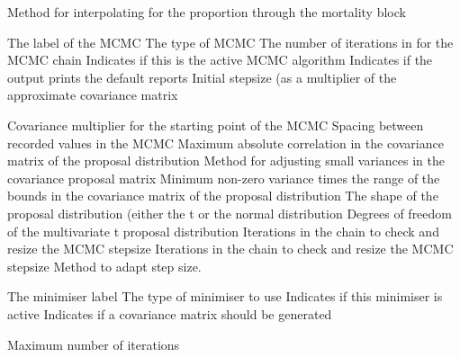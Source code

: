  {Method for interpolating for the proportion through the mortality block}
\par\textbf{}\par
\par\textbf{}\par
{}\par\par
{} {The label of the MCMC}
 {The type of MCMC}
 {The number of iterations in for the MCMC chain}
 {Indicates if this is the active MCMC algorithm}
 {Indicates if the output prints the default reports}
 {Initial stepsize (as a multiplier of the approximate covariance matrix}
\par\textbf{}\par
{} {Covariance multiplier for the starting point of the MCMC}
 {Spacing between recorded values in the MCMC}
 {Maximum absolute correlation in the covariance matrix of the proposal distribution}
 {Method for adjusting small variances in the covariance proposal matrix}
 {Minimum non-zero variance times the range of the bounds in the covariance matrix of the proposal distribution}
 {The shape of the proposal distribution (either the t or the normal distribution}
 {Degrees of freedom of the multivariate t proposal distribution}
 {Iterations in the chain to check and resize the MCMC stepsize}
 {Iterations in the chain to check and resize the MCMC stepsize}
 {Method to adapt step size.}
\par\par
{} {The minimiser label}
 {The type of minimiser to use}
 {Indicates if this minimiser is active}
 {Indicates if a covariance matrix should be generated}
\par\textbf{}\par
{} {Maximum number of iterations}
